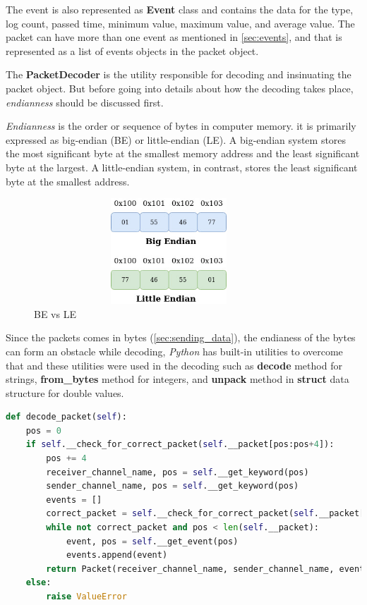 The event is also represented as \textbf{Event} class and contains the data for the type, log count, 
passed time, minimum value, maximum value, and average value. The packet can have more than one event
as mentioned in \ref{sec:events}, and that is represented as a list of events objects in the packet object.

The \textbf{PacketDecoder} is the utility responsible for decoding and insinuating the packet object. But
before going into details about how the decoding takes place, \textit{endianness} should be discussed first.

\textit{Endianness} is the order or sequence of bytes in computer memory. 
it is primarily expressed as big-endian (BE) or little-endian (LE). 
A big-endian system stores the most significant byte at the smallest memory address and 
the least significant byte at the largest. A little-endian system, in contrast, stores 
the least significant byte at the smallest address.
\newline
\begin{figure}[H]
	\centering
	\includegraphics[width=0.9\textwidth,height=150px]{images/endianess.jpg}
	\caption{BE vs LE}
	\label{fig:be_vs_le}
\end{figure}
Since the packets comes in bytes (\ref{sec:sending_data}), the endianess of the bytes can form
an obstacle while decoding, \textit{Python} has built-in utilities to overcome that and these utilities
were used in the decoding such as \textbf{decode} method for strings, \textbf{from\_bytes} method for integers,
and \textbf{unpack} method in \textbf{struct} data structure for double values.
\newline
\begin{lstlisting}[language=Python, label=code:decoding, caption={Decoding of a packet},captionpos=b]
def decode_packet(self):
	pos = 0
	if self.__check_for_correct_packet(self.__packet[pos:pos+4]):
		pos += 4
		receiver_channel_name, pos = self.__get_keyword(pos)
		sender_channel_name, pos = self.__get_keyword(pos)
		events = []
		correct_packet = self.__check_for_correct_packet(self.__packet[pos:pos+4])
		while not correct_packet and pos < len(self.__packet):
			event, pos = self.__get_event(pos)
			events.append(event)
		return Packet(receiver_channel_name, sender_channel_name, events)
	else:
		raise ValueError
\end{lstlisting}
